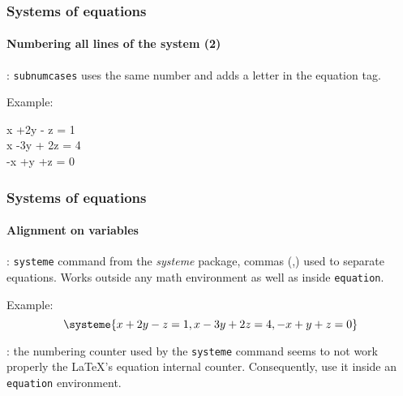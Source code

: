 \documentclass[11pt]{beamer}
\begin{document}
\begin{frame}
	\frametitle{Systems of equations}
	\framesubtitle{Numbering all lines of the system (2)}
	
	: \texttt{subnumcases} uses the same number and adds a letter in the equation tag.
	
	Example:
	\begin{subnumcases}{}
		x  +2y - z  = 1 \\
		x  -3y + 2z = 4 \\
		-x +y  +z   = 0 
	\end{subnumcases}
\end{frame}

\begin{frame}
	\frametitle{Systems of equations}
	\framesubtitle{Alignment on variables}
	
	: \texttt{systeme} command from the \emph{systeme} package, commas (,) used to separate equations.
	Works outside any math environment as well as inside \texttt{equation}.
	
	Example:
	\begin{equation}
		\systeme{%
			x  +2y - z  = 1,
			x  -3y + 2z = 4,
			-x +y  +z   = 0}
	\end{equation}
	
	
	: the numbering counter used by the \texttt{systeme} command seems to not work properly the \LaTeX{}'s equation internal counter.
	Consequently, use it inside an \texttt{equation} environment.
\end{frame}




\end{document}
